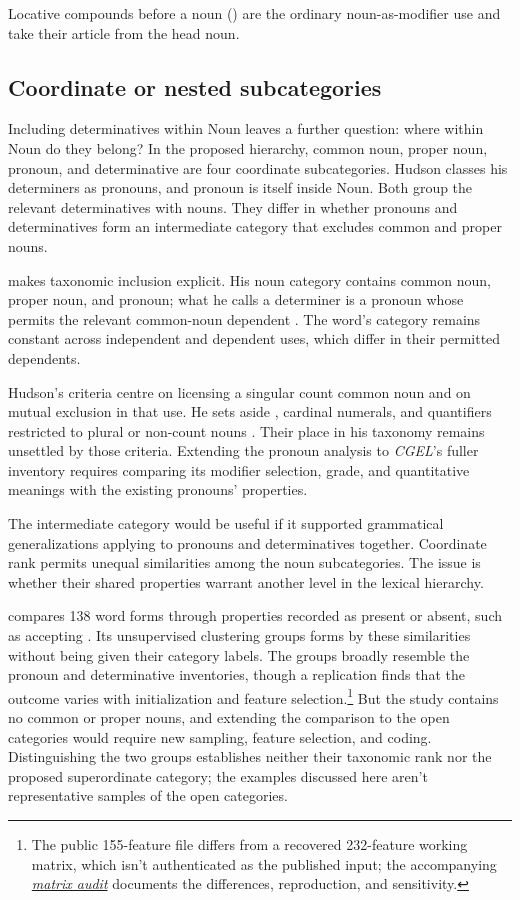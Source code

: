 \documentclass[12pt]{article}
\begin{document}
Locative compounds before a noun () are the ordinary noun-as-modifier use and take their article from the head noun.

\subsection{Coordinate or nested subcategories}\label{sec:inheritance}

Including determinatives within Noun leaves a further question: where within Noun do they belong? In the proposed hierarchy, common noun, proper noun, pronoun, and determinative are four coordinate subcategories. Hudson classes his determiners as pronouns, and pronoun is itself inside Noun. Both group the relevant determinatives with nouns. They differ in whether pronouns and determinatives form an intermediate category that excludes common and proper nouns.

\textcite[253--254]{hudson2010wordgrammar} makes taxonomic inclusion explicit. His noun category contains common noun, proper noun, and pronoun; what he calls a determiner is a pronoun whose  permits the relevant common-noun dependent \citep[9--10]{hudson2004determiners}. The word's category remains constant across independent and dependent uses, which differ in their permitted dependents.

Hudson's criteria centre on licensing a singular count common noun and on mutual exclusion in that use. He sets aside , cardinal numerals, and quantifiers restricted to plural or non-count nouns \citep[9--10]{hudson2004determiners}. Their place in his taxonomy remains unsettled by those criteria. Extending the pronoun analysis to \textit{CGEL}'s fuller inventory requires comparing its modifier selection, grade, and quantitative meanings with the existing pronouns' properties.

The intermediate category would be useful if it supported grammatical generalizations applying to pronouns and determinatives together. Coordinate rank permits unequal similarities among the noun subcategories. The issue is whether their shared properties warrant another level in the lexical hierarchy.

\textcite{reynolds2021} compares 138 word forms through properties recorded as present or absent, such as accepting . Its unsupervised clustering groups forms by these similarities without being given their category labels. The groups broadly resemble the pronoun and determinative inventories, though a replication finds that the outcome varies with initialization and feature selection.\footnote{The public 155-feature file differs from a recovered 232-feature working matrix, which isn't authenticated as the published input; the accompanying \href{run:matrix-audit.pdf}{\textit{matrix audit}} documents the differences, reproduction, and sensitivity.} But the study contains no common or proper nouns, and extending the comparison to the open categories would require new sampling, feature selection, and coding. Distinguishing the two groups establishes neither their taxonomic rank nor the proposed superordinate category; the examples discussed here aren't representative samples of the open categories.
\end{document}
